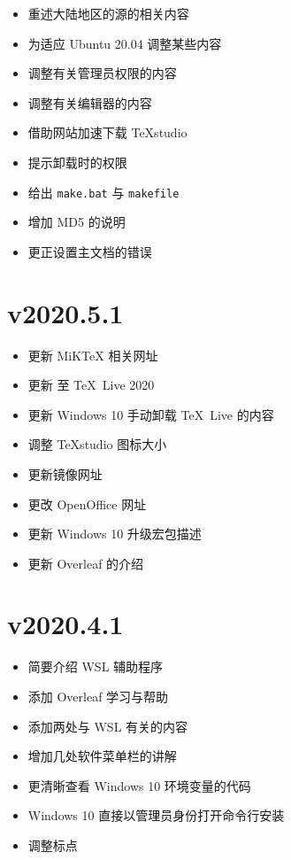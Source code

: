 \begin{itemize}
  \item 重述大陆地区的源的相关内容
  \item 为适应 Ubuntu 20.04 调整某些内容
  \item 调整有关管理员权限的内容
  \item 调整有关编辑器的内容
  \item 借助网站加速下载 TeXstudio
  \item 提示卸载时的权限
  \item 给出 \texttt{make.bat} 与 \texttt{makefile}
  \item 增加 MD5 的说明
  \item 更正设置主文档的错误
\end{itemize}

\section*{v2020.5.1}

\begin{itemize}
  \item 更新 MiK\TeX{} 相关网址
  \item 更新 至 \TeX\ Live 2020
  \item 更新 Windows 10 手动卸载 \TeX\ Live 的内容
  \item 调整 \TeX studio 图标大小
  \item 更新镜像网址
  \item 更改 \textsf{OpenOffice} 网址
  \item 更新 Windows 10 升级宏包描述
  \item 更新 Overleaf 的介绍
\end{itemize}

\section*{v2020.4.1}

\begin{itemize}
  \item 简要介绍 WSL 辅助程序
  \item 添加 Overleaf 学习与帮助
  \item 添加两处与 WSL 有关的内容
  \item 增加几处软件菜单栏的讲解
  \item 更清晰查看 Windows 10 环境变量的代码
  \item Windows 10 直接以管理员身份打开命令行安装
  \item 调整标点
\end{itemize}


